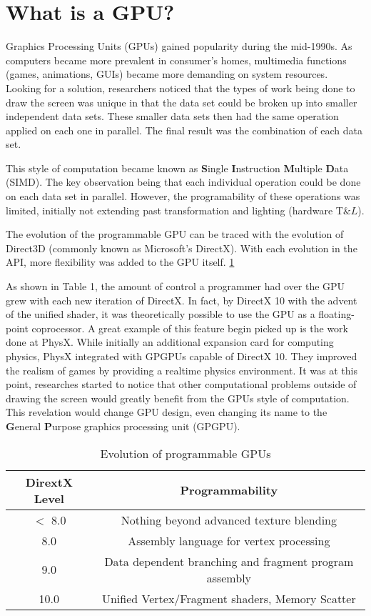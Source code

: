 \section*{What is a GPU?}

Graphics Processing Units (GPUs) gained popularity during the mid-1990s. As computers became more prevalent in consumer's homes, multimedia functions (games, animations, GUIs) became more demanding on system resources. Looking for a solution, researchers noticed that the types of work being done to draw the screen was unique in that the data set could be broken up into smaller independent data sets. These smaller data sets then had the same operation applied on each one in parallel. The final result was the combination of each data set. 

This style of computation became known as \textbf{S}ingle \textbf{I}nstruction \textbf{M}ultiple \textbf{D}ata (SIMD). The key observation being that each individual operation could be done on each data set in parallel. However, the programability of these operations was limited, initially not extending past transformation and lighting (hardware T$\&L$). 

The evolution of the programmable GPU can be traced with the evolution of Direct3D (commonly known as Microsoft's DirectX). With each evolution in the API, more flexibility was added to the GPU itself. \ref{tab:gpuevolution}

As shown in Table 1, the amount of control a programmer had over the GPU grew with each new iteration of DirectX. In fact, by DirectX 10 with the advent of the unified shader, it was theoretically possible to use the GPU as a floating-point coprocessor. A great example of this feature begin picked up is the work done at PhysX. While initially an additional expansion card for computing physics, PhysX integrated with GPGPUs capable of DirectX 10. They improved the realism of games by providing a realtime physics environment. It was at this point, researches started to notice that other computational problems outside of drawing the screen would greatly benefit from the GPUs style of computation. This revelation would change GPU design, even changing its name to the \textbf{G}eneral \textbf{P}urpose graphics processing unit (GPGPU). \cite{emergingtech}

\begin{table}
	\begin{tabular}{|c|c|}
		\hline
		\textbf{DirextX Level} & \textbf{Programmability} \\
		\hline
		$<$ 8.0 & Nothing beyond advanced texture blending \\
		8.0 & Assembly language for vertex processing \\
		9.0 & Data dependent branching and fragment program assembly\\
		10.0 & Unified Vertex/Fragment shaders, Memory Scatter \\
		\hline
	\end{tabular}
	\caption{Evolution of programmable GPUs}
	\label{tab:gpuevolution}
\end{table}


